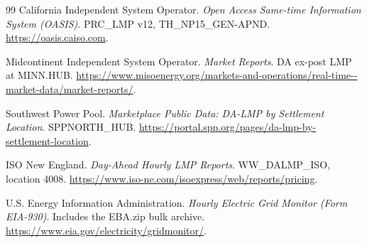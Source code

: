 ﻿\documentclass[12pt]{article}
\begin{document}
\begin{thebibliography}{99}
California Independent System Operator.
\newblock \emph{Open Access Same-time Information System (OASIS)}.
\newblock PRC\_LMP v12, TH\_NP15\_GEN-APND.
\newblock \url{https://oasis.caiso.com}.

Midcontinent Independent System Operator.
\newblock \emph{Market Reports}.
\newblock DA ex-post LMP at MINN.HUB.
\newblock \url{https://www.misoenergy.org/markets-and-operations/real-time--market-data/market-reports/}.

Southwest Power Pool.
\newblock \emph{Marketplace Public Data: DA-LMP by Settlement Location}.
\newblock SPPNORTH\_HUB.
\newblock \url{https://portal.spp.org/pages/da-lmp-by-settlement-location}.

ISO New England.
\newblock \emph{Day-Ahead Hourly LMP Reports}.
\newblock WW\_DALMP\_ISO, location 4008.
\newblock \url{https://www.iso-ne.com/isoexpress/web/reports/pricing}.

U.S. Energy Information Administration.
\newblock \emph{Hourly Electric Grid Monitor (Form EIA-930)}.
\newblock Includes the EBA.zip bulk archive.
\newblock \url{https://www.eia.gov/electricity/gridmonitor/}.

\end{thebibliography}
\end{document}
